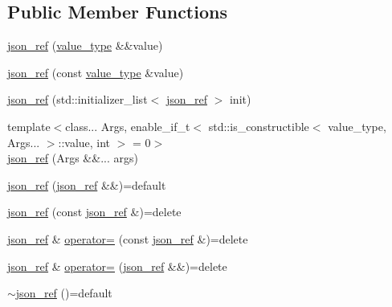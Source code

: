 \subsection*{Public Member Functions}
\begin{DoxyCompactItemize}
\item 
\hyperlink{classnlohmann_1_1detail_1_1json__ref_ae1adf5bcee8b6fa0c358710604fb1938}{json\+\_\+ref} (\hyperlink{classnlohmann_1_1detail_1_1json__ref_a78d76cf288141049568c0d670ed670ef}{value\+\_\+type} \&\&value)
\item 
\hyperlink{classnlohmann_1_1detail_1_1json__ref_a8c3eb3c6e952ed0cd7eece586ab4047c}{json\+\_\+ref} (const \hyperlink{classnlohmann_1_1detail_1_1json__ref_a78d76cf288141049568c0d670ed670ef}{value\+\_\+type} \&value)
\item 
\hyperlink{classnlohmann_1_1detail_1_1json__ref_adfba2db547283a7c6a5df9a32e72efc5}{json\+\_\+ref} (std\+::initializer\+\_\+list$<$ \hyperlink{classnlohmann_1_1detail_1_1json__ref}{json\+\_\+ref} $>$ init)
\item 
{\footnotesize template$<$class... Args, enable\+\_\+if\+\_\+t$<$ std\+::is\+\_\+constructible$<$ value\+\_\+type, Args... $>$\+::value, int $>$  = 0$>$ }\\\hyperlink{classnlohmann_1_1detail_1_1json__ref_a8a31d6c588d6c3c06b62008fd5d36c6c}{json\+\_\+ref} (Args \&\&... args)
\item 
\hyperlink{classnlohmann_1_1detail_1_1json__ref_a59221ddbd756ca24d289c787fab38dbc}{json\+\_\+ref} (\hyperlink{classnlohmann_1_1detail_1_1json__ref}{json\+\_\+ref} \&\&)=default
\item 
\hyperlink{classnlohmann_1_1detail_1_1json__ref_a4c68db46934e03588bbd73b00147c0dd}{json\+\_\+ref} (const \hyperlink{classnlohmann_1_1detail_1_1json__ref}{json\+\_\+ref} \&)=delete
\item 
\hyperlink{classnlohmann_1_1detail_1_1json__ref}{json\+\_\+ref} \& \hyperlink{classnlohmann_1_1detail_1_1json__ref_a98956ba676b1ae16b62346f9c4fb752e}{operator=} (const \hyperlink{classnlohmann_1_1detail_1_1json__ref}{json\+\_\+ref} \&)=delete
\item 
\hyperlink{classnlohmann_1_1detail_1_1json__ref}{json\+\_\+ref} \& \hyperlink{classnlohmann_1_1detail_1_1json__ref_a9a73363d9be6b300ddd30745786c50a6}{operator=} (\hyperlink{classnlohmann_1_1detail_1_1json__ref}{json\+\_\+ref} \&\&)=delete
\item 
\hyperlink{classnlohmann_1_1detail_1_1json__ref_a8bcd4cfcafe952ce5140f8cb35ebe2f6}{$\sim$json\+\_\+ref} ()=default
\item 

\end{DoxyCompactItemize}
